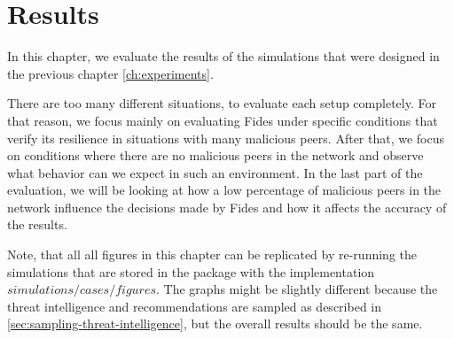 \chapter{Results}
\label{ch:results}

In this chapter, we evaluate the results of the simulations that were designed in the previous chapter \ref{ch:experiments}.

There are too many different situations, to evaluate each setup completely.
For that reason, we focus mainly on evaluating Fides under specific conditions that verify its resilience in situations with many malicious peers.
After that, we focus on conditions where there are no malicious peers in the network and observe what behavior can we expect in such an environment.
In the last part of the evaluation, we will be looking at how a low percentage of malicious peers in the network influence the decisions made by Fides and how it affects the accuracy of the results.

Note, that all all figures in this chapter can be replicated by re-running the simulations that are stored in the package with the implementation $simulations/cases/figures$.
The graphs might be slightly different because the threat intelligence and recommendations are sampled as described in \ref{sec:sampling-threat-intelligence}, but the overall results should be the same.



